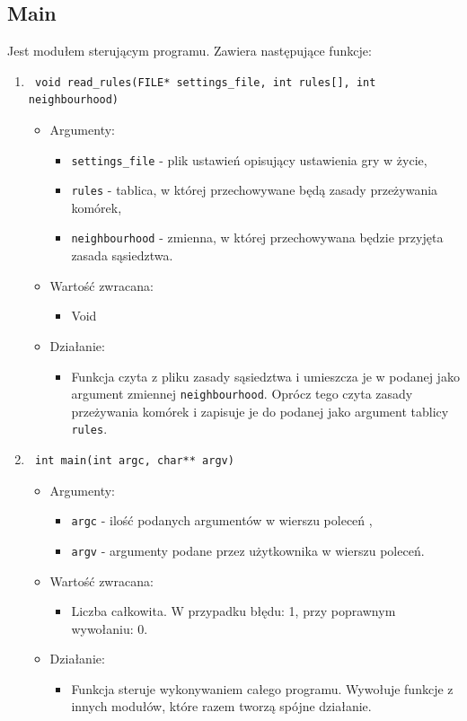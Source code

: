 \documentclass[a4paper,11pt, notitlepage ]{article}
\begin{document}
\subsection{Main}
Jest modułem sterującym programu. Zawiera następujące funkcje:
\begin{enumerate}

\item \begin{verbatim} void read_rules(FILE* settings_file, int rules[], int neighbourhood) \end{verbatim}
\begin{itemize}
\item Argumenty:
\begin{itemize}
\item \verb+settings_file+ - plik ustawień opisujący ustawienia gry w życie,
\item \verb+rules+ - tablica, w której przechowywane będą zasady przeżywania komórek,
\item \verb+neighbourhood+ - zmienna, w której przechowywana będzie przyjęta zasada sąsiedztwa.
\end{itemize}
\item Wartość zwracana:
\begin{itemize}
\item Void
\end{itemize}
\item Działanie:
\begin{itemize}
\item Funkcja czyta z pliku zasady sąsiedztwa i umieszcza je w podanej jako argument zmiennej \verb+neighbourhood+.
Oprócz tego czyta zasady przeżywania komórek i zapisuje je do podanej jako argument tablicy \verb+rules+. 
\end{itemize}
\end{itemize}


\item \begin{verbatim} int main(int argc, char** argv) \end{verbatim}
\begin{itemize}
\item Argumenty:
\begin{itemize}
\item \verb+argc+ - ilość podanych argumentów w wierszu poleceń ,
\item \verb+argv+ - argumenty podane przez użytkownika w wierszu poleceń.
\end{itemize}
\item Wartość zwracana:
\begin{itemize}
\item Liczba całkowita. W przypadku błędu: 1, przy poprawnym wywołaniu: 0.
\end{itemize}
\item Działanie:
\begin{itemize}
\item Funkcja steruje wykonywaniem całego programu. Wywołuje funkcje z innych modułów, które razem tworzą spójne działanie. 
\end{itemize}
\end{itemize}

\end{enumerate}
\end{document}
